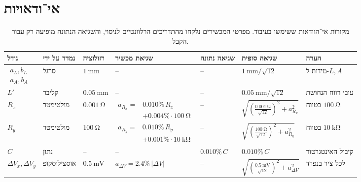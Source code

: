 \documentclass{extarticle}
\begin{document}
\section{אי־ודאויות}
\begin{table}[H]
\centering
\scriptsize
\setlength{\tabcolsep}{2pt}
\begin{tabularx}{\textwidth}{@{}>{\raggedleft\arraybackslash}p{}>{\raggedleft\arraybackslash}p{}>{\raggedleft\arraybackslash}p{}>{\raggedleft\arraybackslash}p{}>{\raggedleft\arraybackslash}p{}>{\raggedleft\arraybackslash}X>{\raggedleft\arraybackslash}p{}@{}}
\toprule
גודל & נמדד על ידי & רזולוציה & שגיאת מכשיר & שגיאה נתונה & שגיאה סופית & הערה \\
\midrule
$\begin{gathered}a_L,b_L\\a_A,b_A\end{gathered}$ & סרגל & $\SI{1}{\milli\meter}$ & -- & -- & $\SI{1}{\milli\meter}/\sqrt{12}$ & מידות ל-$L,A$ \\
$L'$ & קליבר & $\SI{0.05}{\milli\meter}$ & -- & -- & $\SI{0.05}{\milli\meter}/\sqrt{12}$ & עובי רווח הנחושת \\
$R_x$ & מולטימטר & $\SI{0.001}{\ohm}$ & $\begin{aligned}a_{R_x}={}&0.010\%\,R_x\\&+0.004\%\cdot\SI{100}{\ohm}\end{aligned}$ & -- & $\sqrt{\left(\frac{\SI{0.001}{\ohm}}{\sqrt{12}}\right)^2+a_{R_x}^2}$ & בטווח $\SI{100}{\ohm}$ \\
$R_y$ & מולטימטר & $\SI{100}{\ohm}$ & $\begin{aligned}a_{R_y}={}&0.010\%\,R_y\\&+0.001\%\cdot\SI{10}{\kilo\ohm}\end{aligned}$ & -- & $\sqrt{\left(\frac{\SI{100}{\ohm}}{\sqrt{12}}\right)^2+a_{R_y}^2}$ & בטווח $\SI{10}{\kilo\ohm}$ \\
$C$ & נתון & -- & -- & $0.010\%\,C$ & $0.010\%\,C$ & קיבול האינטגרטור \\
$\Delta V_x,\Delta V_y$ & אוסצילוסקופ & $\SI{0.5}{\milli\volt}$ & $a_{\Delta V}=2.4\%\,|\Delta V|$ & -- & $\sqrt{\left(\frac{\SI{0.5}{\milli\volt}}{\sqrt{12}}\right)^2+a_{\Delta V}^2}$ & לכל ציר בנפרד \\
\bottomrule
\end{tabularx}
\caption{מקורות אי־הוודאות ששימשו בעיבוד. מפרטי המכשירים נלקחו מהתדריכים הרלוונטיים לניסוי, והשגיאה הנתונה מופיעה רק עבור הקבל.}
\label{tab:uncertaintiesA}
\end{table}
\end{document}
